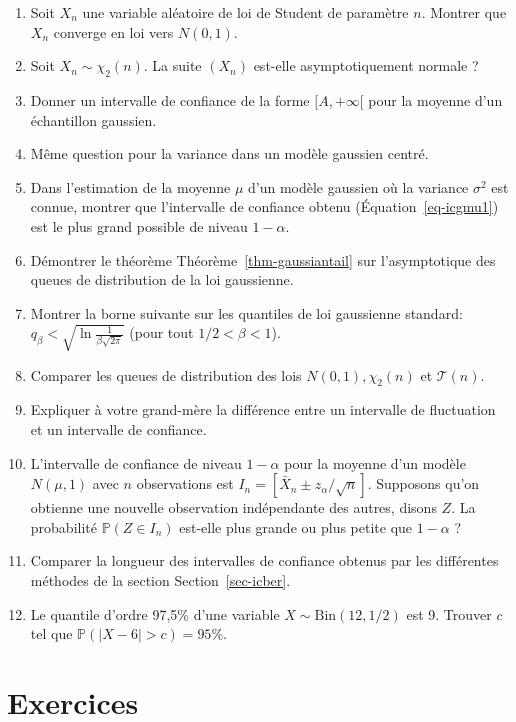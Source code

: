\documentclass[
  10,
  letterpaper,
  DIV=11,
  numbers=noendperiod]{scrreport}
\providecommand{\tightlist}{%
  \setlength{\itemsep}{0pt}\setlength{\parskip}{0pt}}\usepackage{longtable,booktabs,array}
\theoremstyle{plain}
\theoremstyle{definition}
\theoremstyle{plain}
\theoremstyle{definition}
\theoremstyle{definition}
\theoremstyle{plain}
\theoremstyle{remark}
\begin{document}
\begin{enumerate}
\def\labelenumi{\arabic{enumi}.}
\tightlist
\item
  Soit \(X_n\) une variable aléatoire de loi de Student de paramètre
  \(n\). Montrer que \(X_n\) converge en loi vers \(N(0,1)\).
\item
  Soit \(X_n \sim \chi_2(n)\). La suite \((X_n)\) est-elle
  asymptotiquement normale ?
\item
  Donner un intervalle de confiance de la forme \([A,+\infty[\) pour la
  moyenne d'un échantillon gaussien.
\item
  Même question pour la variance dans un modèle gaussien centré.
\item
  Dans l'estimation de la moyenne \(\mu\) d'un modèle gaussien où la
  variance \(\sigma^2\) est connue, montrer que l'intervalle de
  confiance obtenu (Équation~\ref{eq-icgmu1}) est le plus grand possible
  de niveau \(1-\alpha\).
\item
  Démontrer le théorème Théorème~\ref{thm-gaussiantail} sur
  l'asymptotique des queues de distribution de la loi gaussienne.
\item
  Montrer la borne suivante sur les quantiles de loi gaussienne
  standard:~\(q_\beta < \sqrt{\ln\frac{1}{\beta\sqrt{2\pi}}}\) (pour
  tout \(1/2<\beta<1\)).\\
\item
  Comparer les queues de distribution des lois \(N(0,1), \chi_2(n)\) et
  \(\mathscr{T}(n)\).
\item
  Expliquer à votre grand-mère la différence entre un intervalle de
  fluctuation et un intervalle de confiance.
\item
  L'intervalle de confiance de niveau \(1-\alpha\) pour la moyenne d'un
  modèle \(N(\mu, 1)\) avec \(n\) observations est
  \(I_n = [\bar{X}_n \pm z_\alpha /\sqrt{n}]\). Supposons qu'on obtienne
  une nouvelle observation indépendante des autres, disons \(Z\). La
  probabilité \(\mathbb{P}(Z \in I_n)\) est-elle plus grande ou plus
  petite que \(1-\alpha\) ?
\item
  Comparer la longueur des intervalles de confiance obtenus par les
  différentes méthodes de la section Section~\ref{sec-icber}.
\item
  Le quantile d'ordre 97,5\% d'une variable
  \(X\sim \mathrm{Bin}(12,1/2)\) est 9. Trouver \(c\) tel que
  \(\mathbb{P}(|X-6|>c)=95\%\).
\end{enumerate}

\hypertarget{exercices-3}{%
\section*{Exercices}\label{exercices-3}}
\end{document}
